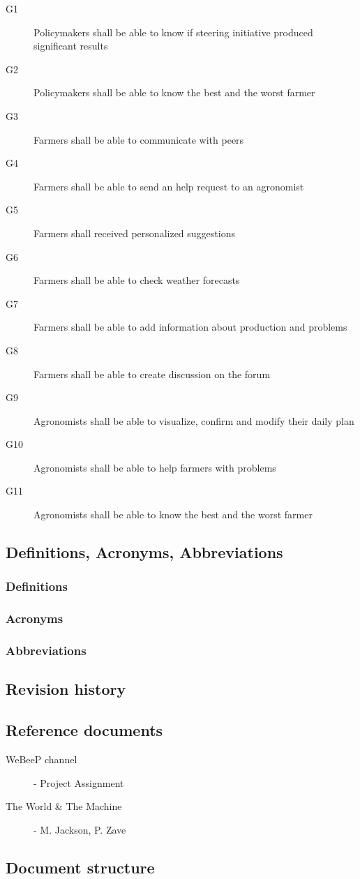 \begin{description}
    \item [G1] Policymakers shall be able to know if steering initiative produced significant results
    \item [G2] Policymakers shall be able to know the best and the worst farmer
    \item [G3] Farmers shall be able to communicate with peers
    \item [G4] Farmers shall be able to send an help request to an agronomist
    \item [G5] Farmers shall received personalized suggestions
    \item [G6] Farmers shall be able to check weather forecasts
    \item [G7] Farmers shall be able to add information about production and problems
    \item [G8] Farmers shall be able to create discussion on the forum
    \item [G9] Agronomists shall be able to visualize, confirm and modify their daily plan
    \item [G10] Agronomists shall be able to help farmers with problems
    \item [G11] Agronomists shall be able to know the best and the worst farmer
\end{description}

\subsection{Definitions, Acronyms, Abbreviations}

\subsubsection{Definitions}

\subsubsection{Acronyms}

\subsubsection{Abbreviations}

\subsection{Revision history}

\subsection{Reference documents}
\begin{description}
    \item [WeBeeP channel] - Project Assignment
    \item [The World \& The Machine] - M. Jackson, P. Zave 
\end{description}

\subsection{Document structure}
